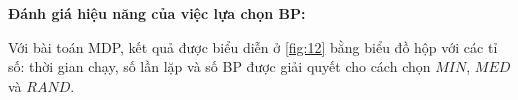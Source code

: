 \documentclass[../main.tex]{subfiles}
\begin{document}

\textbf{Đánh giá hiệu năng của việc lựa chọn BP:}

Với bài toán MDP, kết quả được biểu diễn ở \autoref{fig:12} bằng biểu
đồ hộp với các tỉ số: thời gian chạy, số lần lặp và số BP được giải
quyết cho cách chọn \(MIN\), \(MED\) và \(RAND\).

\end{document}
